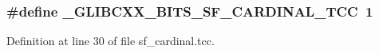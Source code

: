\subsubsection[{\texorpdfstring{\+\_\+\+G\+L\+I\+B\+C\+X\+X\+\_\+\+B\+I\+T\+S\+\_\+\+S\+F\+\_\+\+C\+A\+R\+D\+I\+N\+A\+L\+\_\+\+T\+CC}{_GLIBCXX_BITS_SF_CARDINAL_TCC}}]{\setlength{\rightskip}{0pt plus 5cm}\#define \+\_\+\+G\+L\+I\+B\+C\+X\+X\+\_\+\+B\+I\+T\+S\+\_\+\+S\+F\+\_\+\+C\+A\+R\+D\+I\+N\+A\+L\+\_\+\+T\+CC~1}\hypertarget{sf__cardinal_8tcc_a1e9bb8201f62b2303ba941ea920790b6}{}\label{sf__cardinal_8tcc_a1e9bb8201f62b2303ba941ea920790b6}


Definition at line 30 of file sf\+\_\+cardinal.\+tcc.

